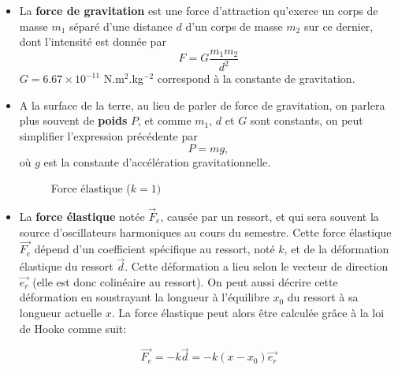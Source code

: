 \documentclass{article}
\begin{document}
\begin{itemize}
    \item La \textbf{force de gravitation} est une force d'attraction qu'exerce un corps de masse $m_1$ séparé d'une distance $d$ d'un corps de masse $m_2$ sur ce dernier, dont l'intensité est donnée par \[F = G\dfrac{m_1m_2}{d^2}\] $G= 6.67 \times 10^{-11}$ N.m$^2$.kg$^{-2}$ correspond à la constante de gravitation.
    \item A la surface de la terre, au lieu de parler de force de gravitation, on parlera plus souvent de \textbf{poids} $P$, et comme $m_1$, $d$ et $G$ sont constants, on peut simplifier l'expression précédente par \[P=mg,\] où $g$ est la constante d'accélération gravitationnelle. 
        \begin{figure}[h]
        \centering
        \caption{Force élastique ($k=1)$}
        \label{fig:hooke}
    \end{figure}
    \item \indent La \textbf{force élastique} notée $\vec{F}_e$, causée par un ressort, et qui sera souvent la source d'oscillateurs harmoniques au cours du semestre. Cette force élastique $\vec{F_e}$ dépend d'un coefficient spécifique au ressort, noté $k$, et de la déformation élastique du ressort $\vec{d}$. Cette déformation a lieu selon le vecteur de direction $\vec{e_r}$ (elle est donc colinéaire au ressort). On peut aussi décrire cette déformation en soustrayant la longueur à l'équilibre $x_0$ du ressort à sa longueur actuelle $x$. La force élastique peut alors être calculée grâce à la loi de Hooke comme suit: 

    \[ \vec{F_e} = -k \vec{d} = -k(x - x_0) \vec{e_r} \]
    

\end{itemize}
\end{document}
